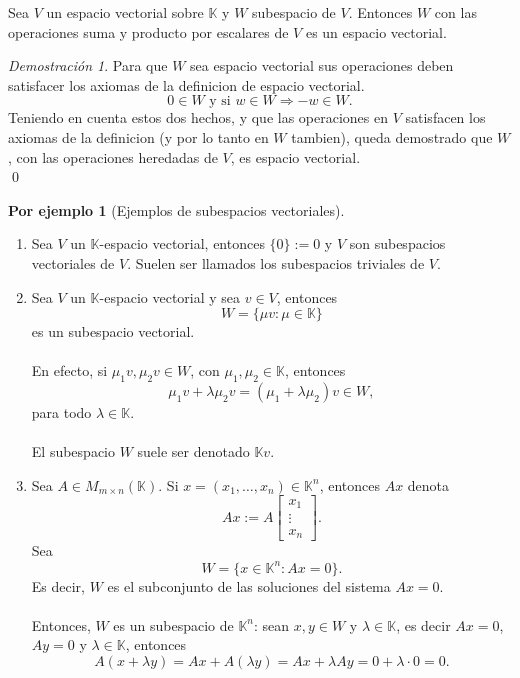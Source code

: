 \documentclass{article}
\theoremstyle{definition}
\theoremstyle{definition}
\newtheorem*{ej}{Por ejemplo}
\theoremstyle{remark}
\newtheorem*{demo}{Demostración}
\begin{document}
\begin{teo}
  Sea $V$ un espacio vectorial sobre $\mathbb{K}$ y $W$ subespacio de $V$. Entonces $W$ con las operaciones suma y producto por escalares de $V$ es un espacio vectorial.
\end{teo}
\begin{demo}
  Para que $W$ sea espacio vectorial sus operaciones deben satisfacer los axiomas de la definicion de espacio vectorial. \[
    0 \in W \text{ y si } w \in W \Rightarrow -w \in W.
  \]
  Teniendo en cuenta estos dos hechos, y que las operaciones en $V$ satisfacen los axiomas de la definicion (y por lo tanto en $W$ tambien), queda demostrado que $W$, con las operaciones heredadas de $V$, es espacio vectorial. \\ \qed
  \end{demo}\begin{ej}[Ejemplos de subespacios vectoriales]\;
\begin{enumerate}[label=\arabic*.]
  \item Sea $V$ un $\mathbb{K}$-espacio vectorial, entonces $\{0\}:=0$ y $V$ son subespacios vectoriales de $V$. Suelen ser llamados los subespacios triviales de $V$.
  \item Sea $V$ un $ \mathbb{K}$-espacio vectorial y sea $v \in V$, entonces \[
      W=\{\mu v : \mu \in \mathbb{K}\}
    \]
    es un subespacio vectorial.\\\\ En efecto, si $\mu_1 v , \mu_2v \in W$, con $\mu _1 , \mu_2 \in \mathbb{K}$, entonces \[
\mu_1 v + \lambda \mu_2v =(\mu_1+\lambda\mu_2)v\in W,
    \]
    para todo $\lambda \in \mathbb{K}$. \\\\ El subespacio $W$ suele ser denotado $\mathbb{K}v$.
  \item Sea $A \in M_{m \times n}(\mathbb{K})$. Si $x = (x_1, \dots ,x_n) \in \mathbb{K}^n$, entonces $Ax$ denota \[
      Ax:=A\begin{bmatrix} x_1 \\ \vdots \\x_n \end{bmatrix}.
    \]
    Sea \[
      W=\{x \in \mathbb{K}^{n} : Ax=0\}.
    \]
    Es decir, $W$ es el subconjunto de las soluciones del sistema $Ax=0$. \\\\ Entonces, $W$ es un subespacio de $\mathbb{K}^n$: sean $x,y \in W$ y $\lambda \in \mathbb{K}$, es decir $Ax=0$, $Ay=0$ y $\lambda \in \mathbb{K}$, entonces \[
A(x+\lambda y)=Ax+A(\lambda y)=Ax+\lambda Ay=0+\lambda \cdot 0 = 0.
\]
\end{enumerate}
\end{ej}
\end{document}
